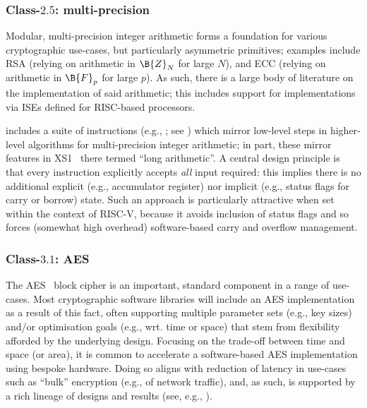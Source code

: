 
\subsubsection{Class-$2.5$: multi-precision}
\label{sec:bg:feature:2:5}

Modular, multi-precision integer arithmetic forms a foundation for various
cryptographic use-cases, but particularly asymmetric primitives; examples 
include
RSA (relying on arithmetic in $\B{Z}_N$ for large $N$),
and
ECC (relying on arithmetic in $\B{F}_p$ for large $p$).
As such, there is a large body of literature on the implementation of said 
arithmetic; this includes support for implementations via ISEs defined for 
RISC-based processors.

\XCID includes a suite of instructions 
(e.g., ; see )
which mirror low-level steps in higher-level algorithms for multi-precision 
integer arithmetic; in part, these mirror features in 
XS1~\cite[Section 18]{SCARV:XS1:09} 
there termed ``long arithmetic''.  A central design principle is that every
instruction explicitly accepts {\em all} input required: this implies there
is no additional
explicit (e.g., accumulator register) 
nor 
implicit (e.g., status flags for carry or borrow)
state.
Such an approach is particularly attractive when set within the context of 
RISC-V, because it avoids inclusion of status flags and so forces (somewhat 
high overhead) software-based carry and overflow management.


\subsubsection{Class-$3.1$: AES}
\label{sec:bg:feature:3:1}

The 
AES~\cite{SCARV:FIPS:197} 
block cipher is an important, standard component in a range of use-cases.  
Most cryptographic software libraries will include an AES implementation 
as a result of this fact, often supporting multiple 
parameter sets     (e.g., key sizes)
and/or
optimisation goals (e.g., wrt. time or space)
that stem from flexibility afforded by the underlying design.
Focusing on the trade-off between time and space (or area), it is common
to accelerate a software-based AES implementation using bespoke hardware.
Doing so aligns with reduction of latency in use-cases such as ``bulk''
encryption (e.g., of network traffic), and, as such, is supported by a
rich lineage of designs and results (see, e.g., ).

